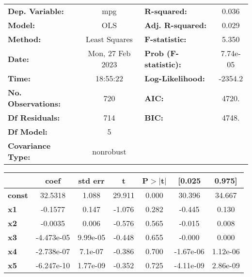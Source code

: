 \begin{center}
\begin{tabular}{lclc}
\toprule
\textbf{Dep. Variable:}    &       mpg        & \textbf{  R-squared:         } &     0.036   \\
\textbf{Model:}            &       OLS        & \textbf{  Adj. R-squared:    } &     0.029   \\
\textbf{Method:}           &  Least Squares   & \textbf{  F-statistic:       } &     5.350   \\
\textbf{Date:}             & Mon, 27 Feb 2023 & \textbf{  Prob (F-statistic):} &  7.74e-05   \\
\textbf{Time:}             &     18:55:22     & \textbf{  Log-Likelihood:    } &   -2354.2   \\
\textbf{No. Observations:} &         720      & \textbf{  AIC:               } &     4720.   \\
\textbf{Df Residuals:}     &         714      & \textbf{  BIC:               } &     4748.   \\
\textbf{Df Model:}         &           5      & \textbf{                     } &             \\
\textbf{Covariance Type:}  &    nonrobust     & \textbf{                     } &             \\
\bottomrule
\end{tabular}
\begin{tabular}{lcccccc}
               & \textbf{coef} & \textbf{std err} & \textbf{t} & \textbf{P$> |$t$|$} & \textbf{[0.025} & \textbf{0.975]}  \\
\midrule
\textbf{const} &      32.5318  &        1.088     &    29.911  &         0.000        &       30.396    &       34.667     \\
\textbf{x1}    &      -0.1577  &        0.147     &    -1.076  &         0.282        &       -0.445    &        0.130     \\
\textbf{x2}    &      -0.0035  &        0.006     &    -0.576  &         0.565        &       -0.015    &        0.008     \\
\textbf{x3}    &   -4.473e-05  &     9.99e-05     &    -0.448  &         0.655        &       -0.000    &        0.000     \\
\textbf{x4}    &   -2.738e-07  &      7.1e-07     &    -0.386  &         0.700        &    -1.67e-06    &     1.12e-06     \\
\textbf{x5}    &   -6.247e-10  &     1.77e-09     &    -0.352  &         0.725        &    -4.11e-09    &     2.86e-09     \\

\end{tabular}
\end{center}
